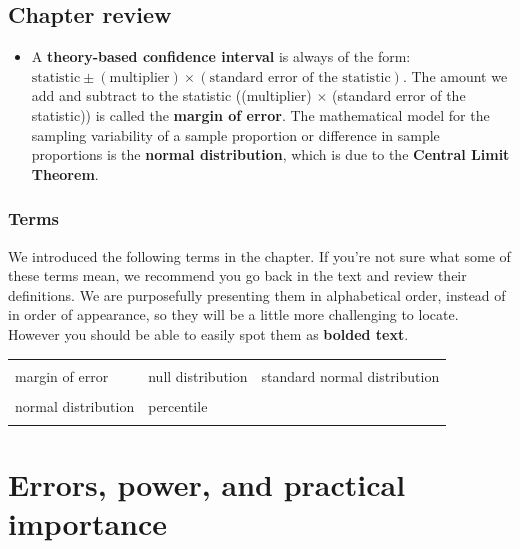 \documentclass[
  10pt,
  openany]{book}
\providecommand{\tightlist}{%
  \setlength{\itemsep}{0pt}\setlength{\parskip}{0pt}}
\theoremstyle{definition}
\theoremstyle{definition}
\theoremstyle{definition}
\theoremstyle{definition}
\theoremstyle{remark}
\begin{document}
\section{Chapter review}\label{chp11-review}

\begin{itemize}
\tightlist
\item
  A \textbf{theory-based confidence interval} is always of the form: \(\mbox{statistic} \pm (\mbox{multiplier}) \times (\mbox{standard error of the statistic})\). The amount we add and subtract to the statistic ((multiplier) \(\times\) (standard error of the statistic)) is called the \textbf{margin of error}. The mathematical model for the sampling variability of a sample proportion or difference in sample proportions is the \textbf{normal distribution}, which is due to the \textbf{Central Limit Theorem}.
\end{itemize}

\subsection*{Terms}\label{terms-9}

We introduced the following terms in the chapter. If you're not sure what some of these terms mean, we recommend you go back in the text and review their definitions. We are purposefully presenting them in alphabetical order, instead of in order of appearance, so they will be a little more challenging to locate. However you should be able to easily spot them as \textbf{bolded text}.

\begin{tabu} to 
\toprule
{} &  & \\
margin of error & null distribution & standard normal distribution\\
 &  & \\
normal distribution & percentile & \\
 &  & \\
\bottomrule
\end{tabu}

\chapter{Errors, power, and practical importance}\label{foundations-errors}
\end{document}
